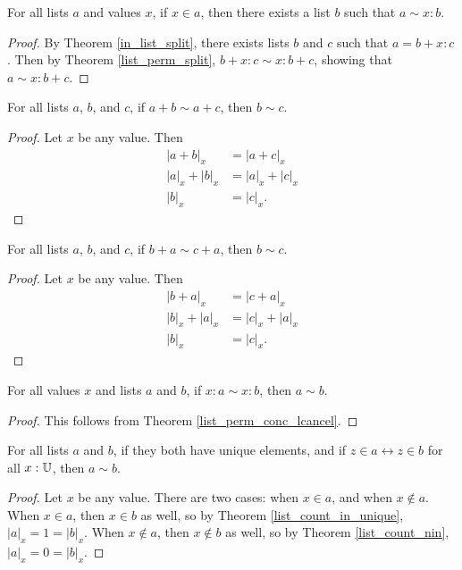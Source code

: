 \documentclass[../../math.tex]{subfiles}
\begin{document}
\begin{theorem} \label{list_split_perm}
    For all lists $a$ and values $x$, if $x \in a$, then there exists a list $b$
    such that $a \sim x : b$.
\end{theorem}
\begin{proof}
    By Theorem \ref{in_list_split}, there exists lists $b$ and $c$ such that $a
    = b + x : c$.  Then by Theorem \ref{list_perm_split}, $b + x : c \sim x : b
    + c$, showing that $a \sim x : b + c$.
\end{proof}

\begin{theorem} \label{list_perm_conc_lcancel}
    For all lists $a$, $b$, and $c$, if $a + b \sim a + c$, then $b \sim c$.
\end{theorem}
\begin{proof}
    Let $x$ be any value.  Then
    \begin{align*}
        |a + b|_x &= |a + c|_x \\
        |a|_x + |b|_x &= |a|_x + |c|_x \\
        |b|_x &= |c|_x.
    \end{align*}
\end{proof}

\begin{theorem} \label{list_perm_conc_rcancel}
    For all lists $a$, $b$, and $c$, if $b + a \sim c + a$, then $b \sim c$.
\end{theorem}
\begin{proof}
    Let $x$ be any value.  Then
    \begin{align*}
        |b + a|_x &= |c + a|_x \\
        |b|_x + |a|_x &= |c|_x + |a|_x \\
        |b|_x &= |c|_x.
    \end{align*}
\end{proof}

\begin{theorem} \label{list_perm_add_eq}
    For all values $x$ and lists $a$ and $b$, if $x : a \sim x : b$, then $a
    \sim b$.
\end{theorem}
\begin{proof}
    This follows from Theorem \ref{list_perm_conc_lcancel}.
\end{proof}

\begin{theorem} \label{list_in_unique_perm}
    For all lists $a$ and $b$, if they both have unique elements, and if $z \in
    a \leftrightarrow z \in b$ for all $x : \mathbb{U}$, then $a \sim b$.
\end{theorem}
\begin{proof}
    Let $x$ be any value.  There are two cases: when $x \in a$, and when $x
    \notin a$.  When $x \in a$, then $x \in b$ as well, so by Theorem
    \ref{list_count_in_unique}, $|a|_x = 1 = |b|_x$.  When $x \notin a$, then $x
    \notin b$ as well, so by Theorem \ref{list_count_nin}, $|a|_x = 0 = |b|_x$.
\end{proof}
\end{document}
